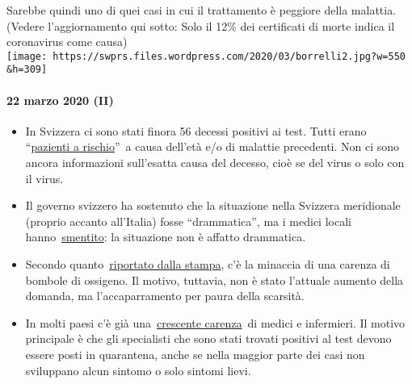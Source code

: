 Sarebbe quindi uno di quei casi in cui il trattamento è peggiore della
malattia. (Vedere l'aggiornamento qui sotto: Solo il 12\% dei
certificati di morte indica il coronavirus come causa)\\

\texttt{[image: https://swprs.files.wordpress.com/2020/03/borrelli2.jpg?w=550\\\&h=309]}

\hypertarget{22-marzo-2020-ii}{%
\paragraph{22 marzo 2020 (II)}\label{22-marzo-2020-ii}}

\begin{itemize}
\tightlist
\item
  In Svizzera ci sono stati finora 56 decessi positivi ai test. Tutti
  erano
  ``\href{https://www.nzz.ch/schweiz/coronavirus-in-der-schweiz-die-neusten-entwicklungen-ld.1542664\#subtitle-wie-viele-infizierte-und-todesf-lle-gibt-es-second}{pazienti
  a rischio}''~a causa dell'età e/o di malattie precedenti. Non ci sono
  ancora informazioni sull'esatta causa del decesso, cioè se del virus o
  solo con il virus.
\item
  Il governo svizzero ha sostenuto che la situazione nella Svizzera
  meridionale (proprio accanto all'Italia) fosse ``drammatica'', ma i
  medici locali
  hanno~\href{https://www.nzz.ch/schweiz/punkto-intensivbetten-sind-wir-im-tessin-besser-ausgeruestet-als-der-rest-der-schweiz-ld.1547728}{smentito}:
  la situazione non è affatto drammatica.
\item
  Secondo
  quanto~\href{https://www.blick.ch/news/schweiz/nicht-nur-beatmungsgeraete-werden-knapp-im-kampf-gegen-corona-es-droht-ein-engpass-beim-sauerstoff-id15808185.html}{riportato
  dalla stampa}, c'è la minaccia di una carenza di bombole di ossigeno.
  Il motivo, tuttavia, non è stato l'attuale aumento della domanda, ma
  l'accaparramento per paura della scarsità.
\item
  In molti paesi c'è già
  una~\href{https://www.washingtonpost.com/health/covid-19-hits-doctors-nurses-emts-threatening-health-system/2020/03/17/f21147e8-67aa-11ea-b313-df458622c2cc_story.html}{crescente
  carenza}~di medici e infermieri. Il motivo principale è che gli
  specialisti che sono stati trovati positivi al test devono essere
  posti in quarantena, anche se nella maggior parte dei casi non
  sviluppano alcun sintomo o solo sintomi lievi.
\end{itemize}

